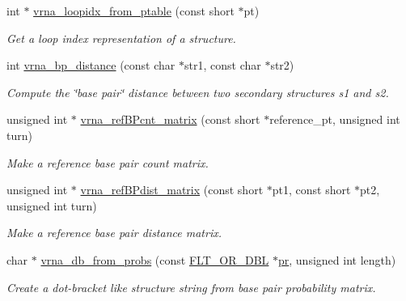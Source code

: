 \begin{DoxyCompactItemize}
\item 
\mbox{\label{group__struct__utils_ga03e15af299be0866ff21da880c74b92e}} 
int $\ast$ \hyperlink{group__struct__utils_ga03e15af299be0866ff21da880c74b92e}{vrna\+\_\+loopidx\+\_\+from\+\_\+ptable} (const short $\ast$pt)
\begin{DoxyCompactList}\small\item\em Get a loop index representation of a structure. \end{DoxyCompactList}\item 
int \hyperlink{group__struct__utils_ga65bdfbac6a16bf30286e8a3f7d15f60a}{vrna\+\_\+bp\+\_\+distance} (const char $\ast$str1, const char $\ast$str2)
\begin{DoxyCompactList}\small\item\em Compute the \char`\"{}base pair\char`\"{} distance between two secondary structures s1 and s2. \end{DoxyCompactList}\item 
unsigned int $\ast$ \hyperlink{group__struct__utils_gab4c2a00c99ce1d612ffa5bde114eb96d}{vrna\+\_\+ref\+B\+Pcnt\+\_\+matrix} (const short $\ast$reference\+\_\+pt, unsigned int turn)
\begin{DoxyCompactList}\small\item\em Make a reference base pair count matrix. \end{DoxyCompactList}\item 
unsigned int $\ast$ \hyperlink{group__struct__utils_ga5a27bd058183170afd4716f5b8ff511a}{vrna\+\_\+ref\+B\+Pdist\+\_\+matrix} (const short $\ast$pt1, const short $\ast$pt2, unsigned int turn)
\begin{DoxyCompactList}\small\item\em Make a reference base pair distance matrix. \end{DoxyCompactList}\item 
\mbox{\label{group__struct__utils_ga0c28c410a5ab22d6ab9c77a84e8d5b44}} 
char $\ast$ \hyperlink{group__struct__utils_ga0c28c410a5ab22d6ab9c77a84e8d5b44}{vrna\+\_\+db\+\_\+from\+\_\+probs} (const \hyperlink{group__data__structures_ga31125aeace516926bf7f251f759b6126}{F\+L\+T\+\_\+\+O\+R\+\_\+\+D\+BL} $\ast$\hyperlink{fold__vars_8h_ac98ec419070aee6831b44e5c700f090f}{pr}, unsigned int length)
\begin{DoxyCompactList}\small\item\em Create a dot-\/bracket like structure string from base pair probability matrix. \end{DoxyCompactList}\item 

\end{DoxyCompactItemize}
